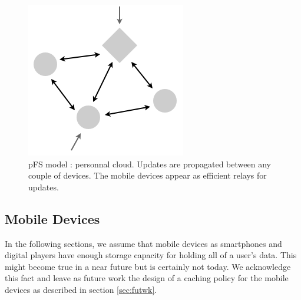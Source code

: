 \begin{figure}[ht]
\begin{center}
  \includegraphics [scale=0.4] {img/pfs_model}
  \caption{\label{PfsModel} {\small pFS model : personnal
      cloud. Updates are propagated between any couple of
      devices. The mobile devices appear as efficient relays 
      for updates.}}
\end{center}
\end{figure}




\subsection {Mobile Devices}

In the following sections, we assume that mobile devices as smartphones and
digital players have enough storage capacity for holding all of a
user's data. This might become true in a near future but is certainly
not today. We acknowledge this fact and leave as future work the
design of a caching policy for the mobile devices as described in section 
\ref{sec:futwk}.



